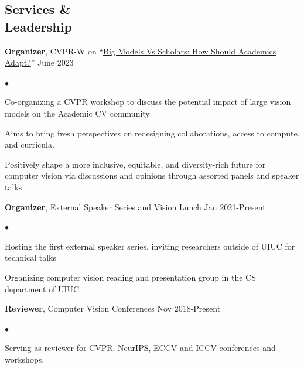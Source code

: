 \documentclass[margin,line]{res}
\newenvironment{list2}{
  \begin{list}{$\bullet$}{%
      \setlength{\itemsep}{0in}
      \setlength{\parsep}{0in} \setlength{\parskip}{0in}
      \setlength{\topsep}{0in} \setlength{\partopsep}{0in} 
      \setlength{\leftmargin}{0.2in}}}{\end{list}}
\begin{document}
\begin{resume}

\section{\sc \large Services \& \\ Leadership}
{\bf Organizer}, CVPR-W on ``\href{https://sites.google.com/view/academic-cv/}{Big Models Vs Scholars: How Should Academics Adapt?}'' {\hfill June 2023}\vspace*{-0.15in}\\
\begin{list2}
\item  Co-organizing a CVPR workshop to discuss the potential impact of large vision models on the Academic CV community
\item Aims to bring fresh perspectives on redesigning collaborations, access to compute, and curricula. 
\item Positively shape a more inclusive, equitable, and diversity-rich future for computer vision via discussions and opinions through assorted panels and speaker talks
\end{list2}\vspace*{-0.05in} 
{\bf Organizer}, External Speaker Series and Vision Lunch {\hfill Jan 2021-Present}\vspace*{-0.15in}\\
\begin{list2}
\item  Hosting the first external speaker series, inviting researchers outside of UIUC for technical talks
\item  Organizing computer vision reading and presentation group in the CS department of UIUC
\end{list2}\vspace*{-0.05in} 
{\bf Reviewer}, Computer Vision Conferences {\hfill Nov  2018-Present}\vspace*{-0.15in}\\
\begin{list2}
\item  Serving as reviewer for CVPR, NeurIPS, ECCV and ICCV conferences and workshops.

\end{list2}
\end{resume}
\end{document}
